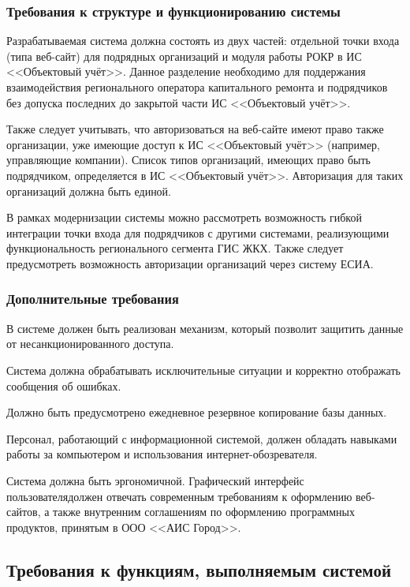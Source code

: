 \subsubsection{Требования к структуре и функционированию системы}

Разрабатываемая система должна состоять из двух частей: отдельной точки входа (типа веб-сайт) для подрядных организаций и модуля работы РОКР в ИС <<Объектовый учёт>>.
Данное разделение необходимо для поддержания взаимодействия регионального оператора капитального ремонта и подрядчиков без допуска последних до закрытой части ИС <<Объектовый учёт>>.

Также следует учитывать, что авторизоваться на веб-сайте имеют право также организации, уже имеющие доступ к ИС <<Объектовый учёт>> (например, управляющие компании).
Список типов организаций, имеющих право быть подрядчиком, определяется в ИС <<Объектовый учёт>>.
Авторизация для таких организаций должна быть единой.

В рамках модернизации системы можно рассмотреть возможность гибкой интеграции точки входа для подрядчиков с другими системами, реализующими \linebreak функциональность регионального сегмента ГИС ЖКХ.
Также следует предусмотреть возможность авторизации организаций через систему ЕСИА.

\subsubsection{Дополнительные требования}

В системе должен быть реализован механизм, который позволит защитить данные от несанкционированного доступа.

Система должна обрабатывать исключительные ситуации и корректно отображать сообщения об ошибках.

Должно быть предусмотрено ежедневное резервное копирование базы данных.

Персонал, работающий с информационной системой, должен обладать навыками работы за компьютером и использования интернет-обозревателя.

Система должна быть эргономичной.
Графический интерфейс пользователя\linebreak должен отвечать современным требованиям к оформлению веб-сайтов, а также внутренним соглашениям по оформлению программных продуктов, принятым в ООО <<АИС Город>>.

\subsection{Требования к функциям, выполняемым системой}

